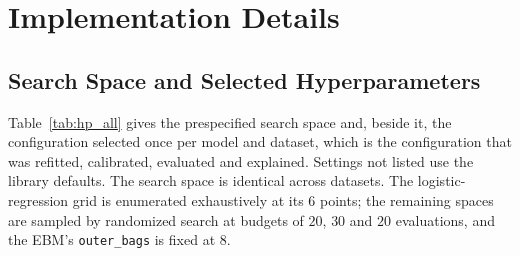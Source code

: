 \appendix

\chapter{Implementation Details}\label{app:repro_details}

\section{Search Space and Selected Hyperparameters}\label{app:hyperparams}

Table~\ref{tab:hp_all} gives the prespecified search space and, beside it, the
configuration selected once per model and dataset, which is the configuration that was refitted,
calibrated, evaluated and explained. Settings not listed use the library defaults. The
search space is identical across datasets. The logistic-regression grid is enumerated
exhaustively at its $6$ points; the remaining spaces are sampled by randomized search at
budgets of $20$, $30$ and $20$ evaluations, and the EBM's \texttt{outer\_bags} is fixed
at $8$.

